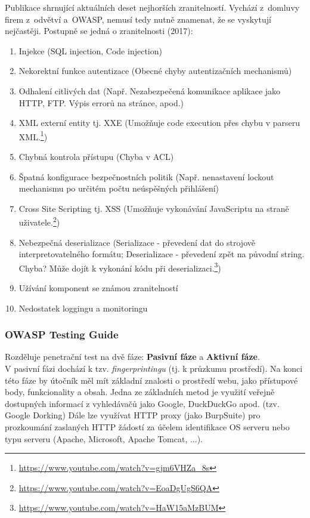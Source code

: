 Publikace shrnující aktuálních deset nejhorších zranitelností. Vychází z~domluvy firem z~odvětví a~OWASP, nemusí tedy nutně znamenat, že se vyskytují nejčastěji. Postupně se jedná o zranitelnosti (2017):
\begin{enumerate}
    \item Injekce (SQL injection, Code injection)
    \item Nekorektní funkce autentizace (Obecné chyby autentizačních mechanismů)
    \item Odhalení citlivých dat (Např. Nezabezpečená komunikace aplikace jako HTTP, FTP. Výpis errorů na stránce, apod.)
    \item XML externí entity tj. XXE (Umožňuje code execution přes chybu v parseru XML.\footnote{\url{https://www.youtube.com/watch?v=gjm6VHZa_8s}})
    \item Chybná kontrola přístupu (Chyba v ACL)
    \item Špatná konfigurace bezpečnostních politik (Např. nenastavení lockout mechanismu po určitém počtu neúspěšných přihlášení)
    \item Cross Site Scripting tj. XSS (Umožňuje vykonávání JavaScriptu na straně uživatele.\footnote{\url{https://www.youtube.com/watch?v=EoaDgUgS6QA}})
    \item Nebezpečná deserializace (Serializace - převedení dat do strojově interpretovatelného formátu; Deserializace - převedení zpět na původní string. Chyba? Může dojít k vykonání kódu při deserializaci.\footnote{\url{https://www.youtube.com/watch?v=HaW15aMzBUM}})
    \item Užívání komponent se známou zranitelností
    \item Nedostatek loggingu a monitoringu
\end{enumerate}

\clearpage

\subsubsection{OWASP Testing Guide}

Rozděluje penetrační test na dvě fáze: \textbf{Pasivní fáze} a \textbf{Aktivní fáze}.
\\

V pasivní fázi dochází k tzv. \textit{fingerprintingu} (tj. k průzkumu prostředí). Na konci této fáze by útočník měl mít základní znalosti o prostředí webu, jako přístupové body, funkcionality a obsah. Jedna ze základních metod je využití veřejně dostupných informací z vyhledávačů jako Google, DuckDuckGo apod. (tzv. Google Dorking) Dále lze využívat HTTP proxy (jako BurpSuite) pro prozkoumání zaslaných HTTP žádostí za účelem identifikace OS serveru nebo typu serveru (Apache, Microsoft, Apache Tomcat, ...). 
\\

